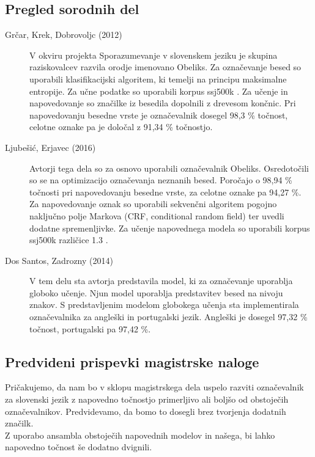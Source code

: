 \documentclass[a4paper, 12pt]{article}
\begin{document}
\subsection{Pregled sorodnih del}

\begin{description}
	\item [Grčar, Krek, Dobrovoljc (2012) \cite{Grcar2012}] V okviru projekta Sporazumevanje v slovenskem jeziku je skupina raziskovalcev razvila orodje imenovano Obeliks. Za označevanje besed so uporabili klasifikacijski algoritem, ki temelji na principu maksimalne entropije. Za učne podatke so uporabili korpus ssj500k \cite{ssj500kv13}. Za učenje in napovedovanje so značilke iz besedila dopolnili z drevesom končnic. Pri napovedovanju besedne vrste je označevalnik dosegel 98,3 \% točnost, celotne oznake pa je določal z 91,34 \% točnostjo.
  \item [Ljubešić, Erjavec (2016) \cite{Ljubesic2016}] Avtorji tega dela so za osnovo uporabili označevalnik Obeliks. Osredotočili so se na optimizacijo označevanja neznanih besed. Poročajo o 98,94 \% točnosti pri napovedovanju besedne vrste, za celotne oznake pa 94,27 \%. Za napovedovanje oznak so uporabili sekvenčni algoritem pogojno naključno polje Markova (CRF, conditional random field) ter uvedli dodatne spremenljivke. Za učenje napovednega modela so uporabili korpus ssj500k različice 1.3 \cite{ssj500kv13}.
  \item [Dos Santos, Zadrozny (2014) \cite{Santos2014}] V tem delu sta avtorja predstavila model, ki za označevanje uporablja globoko učenje. Njun model uporablja predstavitev besed na nivoju znakov. S predstavljenim modelom globokega učenja sta implementirala označevalnika za angleški in portugalski jezik. Angleški je dosegel 97,32 \% točnost, portugalski pa 97,42 \%.

\end{description}

\subsection{Predvideni prispevki magistrske naloge}

Pričakujemo, da nam bo v sklopu magistrskega dela uspelo razviti označevalnik za slovenski jezik z napovedno točnostjo primerljivo ali boljšo od obstoječih označevalnikov. Predvidevamo, da bomo to dosegli brez tvorjenja dodatnih značilk.\\
Z uporabo ansambla obstoječih napovednih modelov in našega, bi lahko napovedno točnost še dodatno dvignili.
\end{document}
